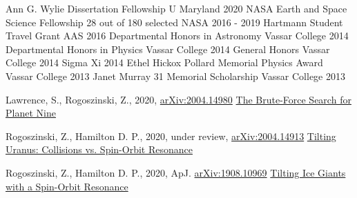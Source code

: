 \documentclass[]{awesome-cv}
\begin{document}
\vspace{-2mm}

\begin{cvhonors}
	\cvhonor
	{Ann G. Wylie Dissertation Fellowship}
	{}
	{U Maryland}
	{2020}
	\cvhonor
	{NASA Earth and Space Science Fellowship}
	{28 out of 180 selected}
	{NASA}
	{2016 - 2019}
	\cvhonor
	{Hartmann Student Travel Grant}
	{}
	{AAS}
	{2016}
	\cvhonor
	{Departmental Honors in Astronomy}
	{}
	{Vassar College}
	{2014}
	\cvhonor
	{Departmental Honors in Physics}
	{}
	{Vassar College}
	{2014}
	\cvhonor
	{General Honors}
	{}
	{Vassar College}
	{2014}
	\cvhonor
	{Sigma Xi}
	{}
	{}
	{2014}
	\cvhonor
	{Ethel Hickox Pollard Memorial Physics Award}
	{}
	{Vassar College}
	{2013}
	\cvhonor
	{Janet Murray \textquotesingle{}31 Memorial Scholarship}
	{}
	{Vassar College}
	{2013}
\end{cvhonors}

\vspace{-2mm}
\begin{cventries}
	\cventry
	{Lawrence, S., Rogoszinski, Z., 2020, \href{https://arxiv.org/pdf/2004.14980.pdf}{arXiv:2004.14980}}
	{\href{https://ui.adsabs.harvard.edu/abs/2020arXiv200414980L/abstract}{The Brute-Force Search for Planet Nine}}
	{}
	{}
	{}
	
	\vspace{-5mm}
	\cventry
	{Rogoszinski, Z., Hamilton D. P., 2020, under review, \href{https://arxiv.org/pdf/2004.14913.pdf}{arXiv:2004.14913}}
	{\href{https://ui.adsabs.harvard.edu/abs/2020arXiv200414913R/abstract}{Tilting Uranus: Collisions vs. Spin-Orbit Resonance}}
	{}
	{}
	{}
	
	
	\vspace{-5mm}
	\cventry
	{Rogoszinski, Z., Hamilton D. P., 2020, ApJ. \href{https://arxiv.org/pdf/1908.10969.pdf}{arXiv:1908.10969}}
	{\href{https://ui.adsabs.harvard.edu/abs/2020ApJ...888...60R/abstract}{Tilting Ice Giants with a Spin-Orbit Resonance}}
	{}
	{}
	{}
	
	\vspace{-6mm}
\end{cventries}
\end{document}
